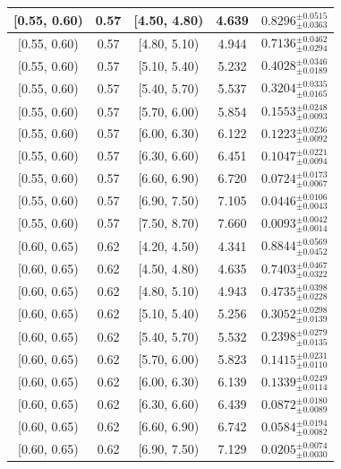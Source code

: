 \begin{longtable}{|c|c|c|c|c|}
\hline
[0.55, 0.60) & 0.57 & [4.50, 4.80) & 4.639 & $0.8296^{ \pm 0.0515 }_{ \pm 0.0363 }$ \\ 
\hline
[0.55, 0.60) & 0.57 & [4.80, 5.10) & 4.944 & $0.7136^{ \pm 0.0462 }_{ \pm 0.0294 }$ \\ 
\hline
[0.55, 0.60) & 0.57 & [5.10, 5.40) & 5.232 & $0.4028^{ \pm 0.0346 }_{ \pm 0.0189 }$ \\ 
\hline
[0.55, 0.60) & 0.57 & [5.40, 5.70) & 5.537 & $0.3204^{ \pm 0.0335 }_{ \pm 0.0165 }$ \\ 
\hline
[0.55, 0.60) & 0.57 & [5.70, 6.00) & 5.854 & $0.1553^{ \pm 0.0248 }_{ \pm 0.0093 }$ \\ 
\hline
[0.55, 0.60) & 0.57 & [6.00, 6.30) & 6.122 & $0.1223^{ \pm 0.0236 }_{ \pm 0.0092 }$ \\ 
\hline
[0.55, 0.60) & 0.57 & [6.30, 6.60) & 6.451 & $0.1047^{ \pm 0.0221 }_{ \pm 0.0094 }$ \\ 
\hline
[0.55, 0.60) & 0.57 & [6.60, 6.90) & 6.720 & $0.0724^{ \pm 0.0173 }_{ \pm 0.0067 }$ \\ 
\hline
[0.55, 0.60) & 0.57 & [6.90, 7.50) & 7.105 & $0.0446^{ \pm 0.0106 }_{ \pm 0.0043 }$ \\ 
\hline
[0.55, 0.60) & 0.57 & [7.50, 8.70) & 7.660 & $0.0093^{ \pm 0.0042 }_{ \pm 0.0014 }$ \\ 
\hline
[0.60, 0.65) & 0.62 & [4.20, 4.50) & 4.341 & $0.8844^{ \pm 0.0569 }_{ \pm 0.0452 }$ \\ 
\hline
[0.60, 0.65) & 0.62 & [4.50, 4.80) & 4.635 & $0.7403^{ \pm 0.0467 }_{ \pm 0.0322 }$ \\ 
\hline
[0.60, 0.65) & 0.62 & [4.80, 5.10) & 4.943 & $0.4735^{ \pm 0.0398 }_{ \pm 0.0228 }$ \\ 
\hline
[0.60, 0.65) & 0.62 & [5.10, 5.40) & 5.256 & $0.3052^{ \pm 0.0298 }_{ \pm 0.0139 }$ \\ 
\hline
[0.60, 0.65) & 0.62 & [5.40, 5.70) & 5.532 & $0.2398^{ \pm 0.0279 }_{ \pm 0.0135 }$ \\ 
\hline
[0.60, 0.65) & 0.62 & [5.70, 6.00) & 5.823 & $0.1415^{ \pm 0.0231 }_{ \pm 0.0110 }$ \\ 
\hline
[0.60, 0.65) & 0.62 & [6.00, 6.30) & 6.139 & $0.1339^{ \pm 0.0249 }_{ \pm 0.0114 }$ \\ 
\hline
[0.60, 0.65) & 0.62 & [6.30, 6.60) & 6.439 & $0.0872^{ \pm 0.0180 }_{ \pm 0.0089 }$ \\ 
\hline
[0.60, 0.65) & 0.62 & [6.60, 6.90) & 6.742 & $0.0584^{ \pm 0.0194 }_{ \pm 0.0082 }$ \\ 
\hline
[0.60, 0.65) & 0.62 & [6.90, 7.50) & 7.129 & $0.0205^{ \pm 0.0074 }_{ \pm 0.0030 }$ \\ 

\end{longtable}
